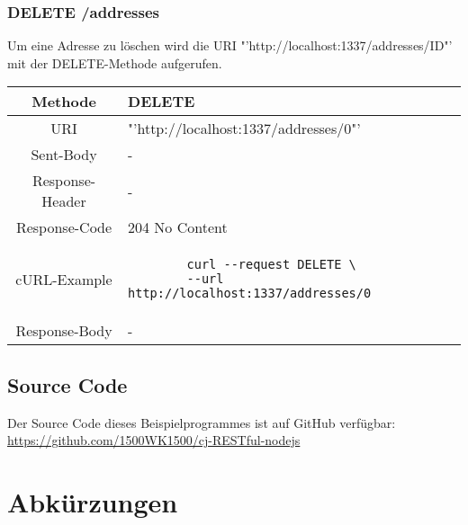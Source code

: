 \documentclass[listof=totoc]{article}
\begin{document}
	\subsubsection{DELETE /addresses}
	Um eine Adresse zu löschen wird die \ac{URI} "'http://localhost:1337/addresses/ID"' mit der DELETE-Methode aufgerufen.
	\newline
	\begin{longtable}{|c|p{10cm}|}
		\hline 
		Methode & DELETE \\ 
		\hline 
		\ac{URI} & "'http://localhost:1337/addresses/0"' \\ 
		\hline 
		Sent-Body & - \\ 
		\hline 
		Response-Header & - \\ 
		\hline 
		Response-Code & 204 No Content \\ 
		\hline 
		cURL-Example &  
		\begin{verbatim}
		curl --request DELETE \
		--url http://localhost:1337/addresses/0
		\end{verbatim}
		\\ 
		\hline 
		Response-Body & - \\ 
		\hline 
	\end{longtable} 
	\newpage
	
	\subsection{Source Code}
	Der Source Code dieses Beispielprogrammes ist auf GitHub verfügbar: \newline
	 \href{https://github.com/1500WK1500/cj-RESTful-nodejs}{https://github.com/1500WK1500/cj-RESTful-nodejs}
	\newpage
	
	\setcounter{secnumdepth}{0}	%
	\section{Abkürzungen}
	\begin{acronym}[HATEOAS]
	\end{acronym}
	\newpage

	

	
	
\end{document}

